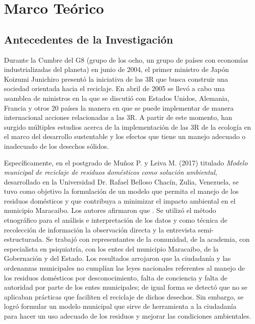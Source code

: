 \vspace*{6cm}
\chapter{Marco Teórico}
\newpage

\section{Antecedentes de la Investigación}

Durante la Cumbre del G8 (grupo de los ocho, un grupo de países con economías industrializadas del planeta) en junio de 2004, el primer ministro de Japón Koizumi Junichiro presentó la iniciativa de las 3R que busca construir una sociedad orientada hacia el reciclaje. En abril de 2005 se llevó a cabo una asamblea de ministros en la que se discutió con Estados Unidos, Alemania, Francia y otros 20 países la manera en que se puede implementar de manera internacional acciones relacionadas a las 3R. A partir de este momento, han surgido múltiples estudios acerca de la implementación de las 3R de la ecología en el marco del desarrollo sustentable y los efectos que tiene un manejo adecuado o inadecuado de los desechos sólidos.

Específicamente, en el postgrado de Muñoz P. y Leiva M. (2017) titulado \textit{Modelo municipal de reciclaje de residuos domésticos como solución ambiental}, desarrollado en la Universidad Dr. Rafael Belloso Chacín, Zulia, Venezuela, se tuvo como objetivo la formulación de un modelo que permita el manejo de los residuos domésticos y que contribuya a minimizar el impacto ambiental en el municipio Maracaibo. Los autores afirmaron que . Se utilizó el método etnográfico para el análisis e interpretación de los datos y como técnica de recolección de información la observación directa y la entrevista semi-estructurada. Se trabajó con representantes de la comunidad, de la academia, con especialista en psiquiatría, con los entes del municipio Maracaibo, de la Gobernación y del Estado. Los resultados arrojaron que la ciudadanía y las ordenanzas municipales no cumplían las leyes nacionales referentes al manejo de los residuos domésticos por desconocimiento, falta de conciencia y falta de autoridad por parte de los entes municipales; de igual forma se detectó que no se aplicaban prácticas que faciliten el reciclaje de dichos desechos. Sin embargo, se logró formular un modelo municipal que sirve de herramienta a la ciudadanía para hacer un uso adecuado de los residuos y mejorar las condiciones ambientales.

